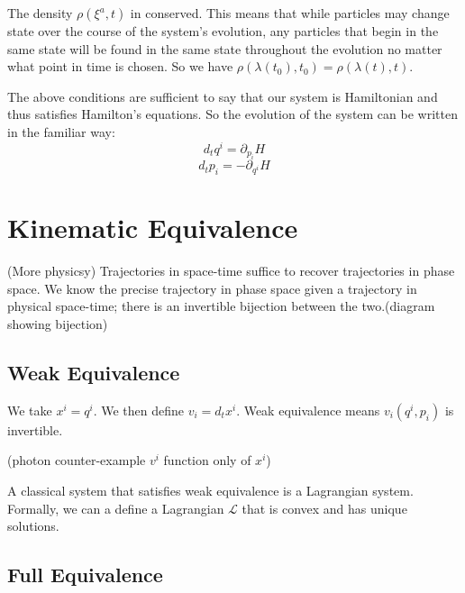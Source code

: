 \documentclass{article}
\begin{document}
\begin{prop}
	The density $\rho(\xi^a,t)$ in conserved. This means that while particles may change state over the course of the system's evolution, any particles that begin in the same state will be found in the same state throughout the evolution no matter what point in time is chosen. So we have $\rho(\lambda(t_0),t_0) = \rho(\lambda(t),t)$.
\end{prop}

\begin{prop}
	The above conditions are sufficient to say that our system is Hamiltonian and thus satisfies Hamilton's equations. So the evolution of the system can be written in the familiar way:
	$$d_tq^i = \partial_{p_i}H$$
	$$d_tp_i = -\partial_{q^i}H$$
\end{prop} 

\section{Kinematic Equivalence}

\begin{assump}
	(More physicsy) Trajectories in space-time suffice to recover trajectories in phase space. We know the precise trajectory in phase space given a trajectory in physical space-time; there is an invertible bijection between the two.(diagram showing bijection)
\end{assump}

\subsection{Weak Equivalence}

\begin{defn}
	We take $x^i = q^i$. We then define $v_i = d_tx^i$. Weak equivalence means $v_i(q^i, p_i)$ is invertible.
\end{defn}

(photon counter-example $v^i$ function only of $x^i$)

\begin{prop}
	A classical system that satisfies weak equivalence is a Lagrangian system. Formally, we can a define a Lagrangian $\mathcal{L}$ that is convex and has unique solutions.
\end{prop}

\subsection{Full Equivalence}
\end{document}
